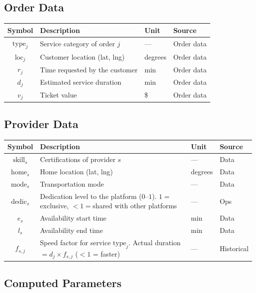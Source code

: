 \documentclass[11pt,a4paper]{article}
\begin{document}
\subsection{Order Data}

\begin{tabular}{@{}clll@{}}
\toprule
\textbf{Symbol} & \textbf{Description} & \textbf{Unit} & \textbf{Source} \\
\midrule
$\text{type}_j$ & Service category of order $j$ & --- & Order data \\
$\text{loc}_j$ & Customer location (lat, lng) & degrees & Order data \\
$r_j$ & Time requested by the customer & min & Order data \\
$d_j$ & Estimated service duration & min & Order data \\
$v_j$ & Ticket value & \$ & Order data \\
\bottomrule
\end{tabular}

\subsection{Provider Data}

\begin{tabular}{@{}cp{7cm}ll@{}}
\toprule
\textbf{Symbol} & \textbf{Description} & \textbf{Unit} & \textbf{Source} \\
\midrule
$\text{skill}_s$ & Certifications of provider $s$ & --- & Data \\
$\text{home}_s$ & Home location (lat, lng) & degrees & Data \\
$\text{mode}_s$ & Transportation mode & --- & Data \\
$\text{dedic}_s$ & Dedication level to the platform ($0$--$1$). \newline $1{=}$exclusive, $<1{=}$shared with other platforms & --- & Ops \\
$e_s$ & Availability start time & min & Data \\
$l_s$ & Availability end time & min & Data \\
$f_{s,j}$ & Speed factor for service $\text{type}_j$. \newline Actual duration $= d_j \times f_{s,j}$ ($<1$ = faster) & --- & Historical \\
\bottomrule
\end{tabular}

\subsection{Computed Parameters}
\end{document}
